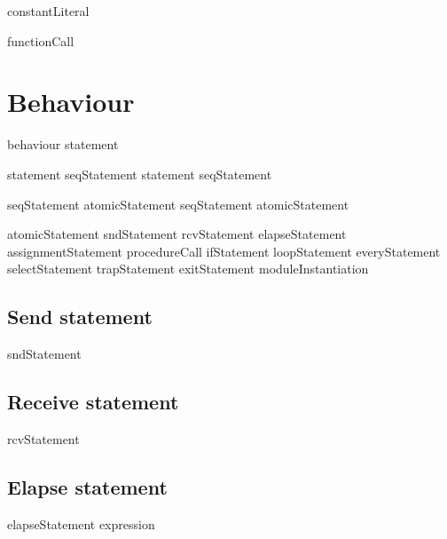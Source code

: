 \bgrm
constantLiteral \Derive
     \trm{\unitval}
\alt {}
\alt {}                 
\alt \numb                   
\egrm

\bgrm
functionCall \Derive
   \trm{(}  \trm{)}
\egrm



\section{Behaviour}
\bgrm
behaviour \Derive
   statement      
\egrm

\bgrm
statement \Derive
  seqStatement \trm{|} statement
\alt seqStatement                 
\egrm

\bgrm
seqStatement \Derive
  atomicStatement \trm{;} seqStatement
\alt atomicStatement               
\egrm

\bgrm
atomicStatement \Derive
\alt {}
\alt sndStatement               
\alt rcvStatement                  
\alt elapseStatement               
\alt assignmentStatement          
\alt procedureCall                                
\alt ifStatement                   
\alt loopStatement                 
\alt everyStatement                
\alt selectStatement              
\alt trapStatement                 
\alt exitStatement                 
\alt moduleInstantiation          
\egrm

\subsection{Send statement}
\bgrm
sndStatement \Derive
    \trm{(}  \trm{,} 
      \trm{)}
\egrm

\subsection{Receive statement}
\bgrm
rcvStatement \Derive
   \trm{(}  \trm{,} 
     \trm{)}                                            
\egrm

\subsection{Elapse statement}
\bgrm
elapseStatement \Derive
   expression        
\egrm

